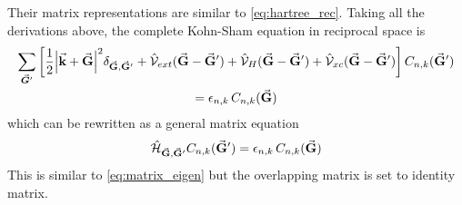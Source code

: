 Their matrix representations are similar to \eqref{eq:hartree_rec}. Taking all the derivations above, the complete Kohn-Sham equation in reciprocal space  is
\begin{multline}\label{eq:KS_rec}
	\sum_{\va*{G}'} \left[ \frac{1}{2} \abs{\va{k} + \va{G}}^2 \delta_{\va{G},\va{G}'} + \hat{\mathcal{V}}_{ext}(\va{G} - \va{G}') + \hat{\mathcal{V}}_H(\va{G} - \va{G}') + \hat{\mathcal{V}}_{xc}(\va{G} - \va{G}') \right] C_{n,k}(\va{G}') \\
	= \epsilon_{n,k}\, C_{n,k}(\va{G})
\end{multline}
which can be rewritten as a general matrix equation
\begin{equation}
	\hat{\mathcal{H}}_{\va{G},\va{G}'} C_{n,k}(\va{G}') =  \epsilon_{n,k}\, C_{n,k}(\va{G})
\end{equation}
This is similar to \eqref{eq:matrix_eigen} but the overlapping matrix is set to identity matrix.

